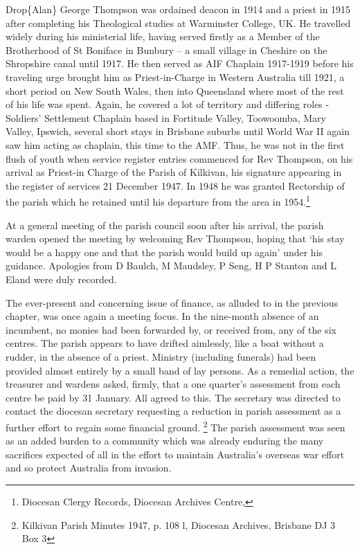 Drop\{Alan\} George Thompson was ordained deacon in 1914 and a priest in 1915 after completing his Theological studies at Warminster College, UK. He travelled widely during his ministerial life, having served firstly as a Member of the Brotherhood of St Boniface in Bunbury -- a small village in Cheshire on the Shropshire canal until 1917. He then served as AIF Chaplain 1917-1919 before his traveling urge brought him as Priest-in-Charge in Western Australia till 1921, a short period on New South Wales, then into Queensland where most of the rest of his life was spent. Again, he covered a lot of territory and differing roles - Soldiers' Settlement Chaplain based in Fortitude Valley, Toowoomba, Mary Valley, Ipswich, several short stays in Brisbane suburbs until World War II again saw him acting as chaplain, this time to the AMF. Thus, he was not in the first flush of youth when service register entries commenced for Rev Thompson, on his arrival as Priest-in Charge of the Parish of Kilkivan, his signature appearing in the register of services 21 December 1947. In 1948 he was granted Rectorship of the parish which he retained until his departure from the area in 1954.\footnote{Diocesan Clergy Records, Diocesan Archives Centre,}

At a general meeting of the parish council soon after his arrival, the parish warden opened the meeting by welcoming Rev Thompson, hoping that `his stay would be a happy one and that the parish would build up again' under his guidance. Apologies from D Baulch, M Maudsley, P Seng, H P Stanton and L Eland were duly recorded.

The ever-present and concerning issue of finance, as alluded to in the previous chapter, was once again a meeting focus. In the nine-month absence of an incumbent, no monies had been forwarded by, or received from, any of the six centres. The parish appears to have drifted aimlessly, like a boat without a rudder, in the absence of a priest. Ministry (including funerals) had been provided almost entirely by a small band of lay persons. As a remedial action, the treasurer and wardens asked, firmly, that a one quarter's assessment from each centre be paid by 31 January. All agreed to this. The secretary was directed to contact the diocesan secretary requesting a reduction in parish assessment as a further effort to regain some financial ground. \footnote{Kilkivan Parish Minutes 1947, p. 108 l, Diocesan Archives, Brisbane DJ 3 Box 3} The parish assessment was seen as an added burden to a community which was already enduring the many sacrifices expected of all in the effort to maintain Australia's overseas war effort and so protect Australia from invasion.

